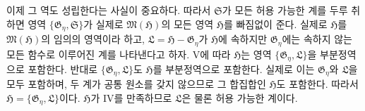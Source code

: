 
이제 그 역도 성립한다는 사실이 중요하다. 따라서 $\mathfrak S$가 모든 허용 가능한 계를 두루 취하면 영역 $\{\mathfrak G_\eta,\mathfrak S\}$가 실제로 $\mathfrak M(\mathfrak H)$의 모든 영역 $\mathfrak H$를 빠짐없이 준다. 실제로 $\mathfrak H$를 $\mathfrak M(\mathfrak H)$의 임의의 영역이라 하고, $\mathfrak L=\mathfrak H-\mathfrak G_\eta$가 $\mathfrak H$에 속하지만 $\mathfrak G_\eta$에는 속하지 않는 모든 함수로 이루어진 계를 나타낸다고 하자. V에 따라 $\mathfrak H$는 영역 $\{\mathfrak G_\eta,\mathfrak L\}$을 부분정역으로 포함한다. 반대로 $\{\mathfrak G_\eta,\mathfrak L\}$도 $\mathfrak H$를 부분정역으로 포함한다. 실제로 이는 $\mathfrak G_\eta$와 $\mathfrak L$을 모두 포함하며, 두 계가 공통 원소를 갖지 않으므로 그 합집합인 $\mathfrak H$도 포함한다. 따라서
$\mathfrak H=\{\mathfrak G_\eta,\mathfrak L\}$이다. $\mathfrak H$가 IV를 만족하므로 $\mathfrak L$은 물론 허용 가능한 계이다.
